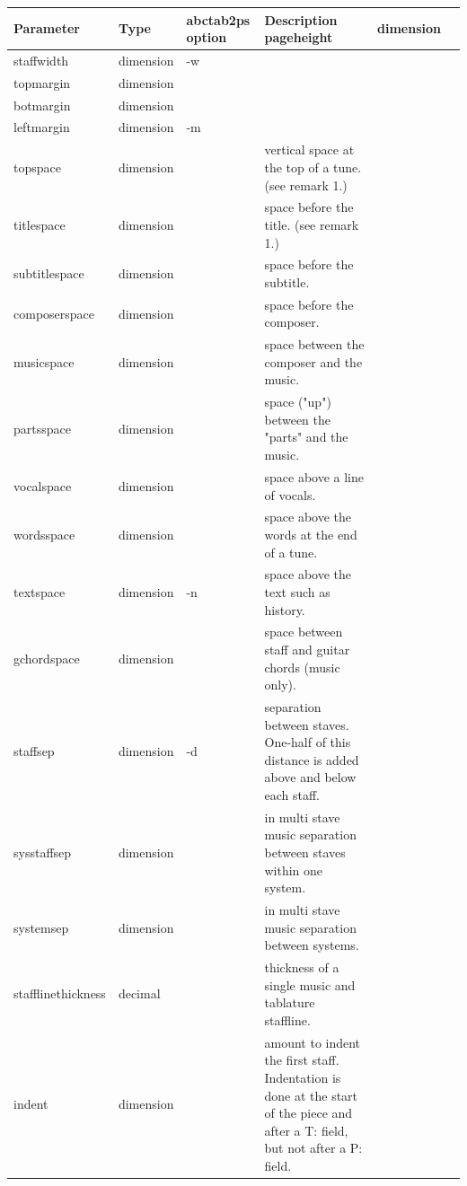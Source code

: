\documentclass[a4paper]{article}
\begin{document}
\begin{center}
\begin{longtable}{|l|l|p{1.8cm}|p{7.2cm}|} \hline
{\bf Parameter} & {\bf Type} & {\bf abctab2ps option} & 
	{\bf Description} \endhead \hline
pageheight & dimension & & \\ \hline
staffwidth & dimension & -w & \\ \hline
topmargin & dimension & & \\ \hline
botmargin & dimension & & \\ \hline
leftmargin & dimension & -m & \\ \hline
topspace & dimension & & 
	vertical space at the top of a tune. (see remark 1.) \\ \hline
titlespace & dimension & & 
	space before the title. (see remark 1.) \\ \hline
subtitlespace & dimension & & 
	space before the subtitle. \\ \hline
composerspace & dimension & & 
	space before the composer. \\ \hline
musicspace  & dimension & & 
	space between the composer and the music. \\ \hline
partsspace  & dimension & & 
	space ("up") between the "parts" and the music. \\ \hline
vocalspace & dimension & & 
	space above a line of vocals. \\ \hline
wordsspace & dimension & & 
	space above the words at the end of a tune. \\ \hline
textspace & dimension & -n & 
	space above the text such as history. \\ \hline
gchordspace & dimension &  & 
	space between staff and guitar chords (music only). \\ \hline
staffsep & dimension & -d & 
	separation between staves. One-half of this distance is 
	added above and below each staff. \\ \hline
sysstaffsep & dimension & &
	in multi stave music separation between staves within
	one system. \\ \hline
systemsep & dimension & &
	in multi stave music separation between systems. \\ \hline
stafflinethickness & decimal & &
	thickness of a single music and tablature staffline. \\ \hline
indent & dimension & &
    amount to indent the first staff. Indentation is done at 
    the start of the piece and after a T: field, but not
    after a P: field. \\ \hline

\end{longtable}
\end{center}
\end{document}
